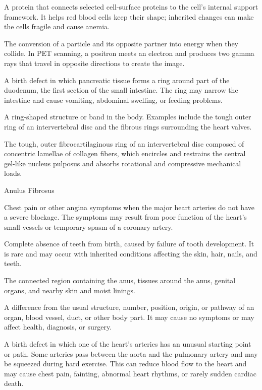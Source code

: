  A protein that connects selected cell-surface proteins to the cell’s internal support framework. It helps red blood cells keep their shape; inherited changes can make the cells fragile and cause anemia.

 The conversion of a particle and its opposite partner into energy when they collide. In PET scanning, a positron meets an electron and produces two gamma rays that travel in opposite directions to create the image.

 A birth defect in which pancreatic tissue forms a ring around part of the duodenum, the first section of the small intestine. The ring may narrow the intestine and cause vomiting, abdominal swelling, or feeding problems.

 A ring-shaped structure or band in the body. Examples include the tough outer ring of an intervertebral disc and the fibrous rings surrounding the heart valves.

 The tough, outer fibrocartilaginous ring of an intervertebral disc composed of concentric lamellae of collagen fibers, which encircles and restrains the central gel-like nucleus pulposus and absorbs rotational and compressive mechanical loads.

\synonyms
Anulus Fibrosus

 Chest pain or other angina symptoms when the major heart arteries do not have a severe blockage. The symptoms may result from poor function of the heart’s small vessels or temporary spasm of a coronary artery.

 Complete absence of teeth from birth, caused by failure of tooth development. It is rare and may occur with inherited conditions affecting the skin, hair, nails, and teeth.

 The connected region containing the anus, tissues around the anus, genital organs, and nearby skin and moist linings.

 A difference from the usual structure, number, position, origin, or pathway of an organ, blood vessel, duct, or other body part. It may cause no symptoms or may affect health, diagnosis, or surgery.

 A birth defect in which one of the heart’s arteries has an unusual starting point or path. Some arteries pass between the aorta and the pulmonary artery and may be squeezed during hard exercise. This can reduce blood flow to the heart and may cause chest pain, fainting, abnormal heart rhythms, or rarely sudden cardiac death.

